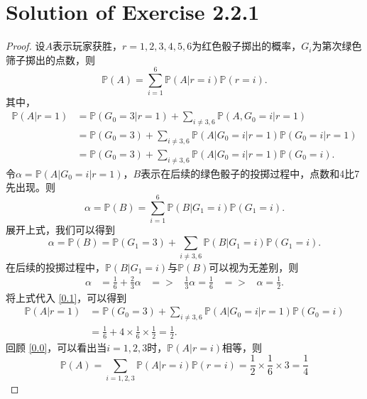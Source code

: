 \documentclass[reqno,a4paper,14pt]{amsart}
\newcommand\Pro{\mathbb{P}}
\begin{document}
\section{Solution of  Exercise 2.2.1}
\begin{proof}
    设$A$表示玩家获胜，$r=1,2,3,4,5,6$为红色骰子掷出的概率，$G_i$为第次绿色筛子掷出的点数，则
    \begin{equation}
        \Pro(A)=\sum_{i=1}^6 \Pro(A|r=i)\Pro(r=i).
        \label{0.0}
    \end{equation}
    其中，
    \begin{equation}
        \begin{split}
            \Pro(A|r=1)&=\Pro(G_0=3|r=1)+\sum_{i\neq 3,6}\Pro(A,G_0=i|r=1)\\
            &=\Pro(G_0=3)+\sum_{i\neq 3,6}\Pro(A|G_0=i|r=1)\Pro(G_0=i|r=1)\\
            &=\Pro(G_0=3)+\sum_{i\neq 3,6}\Pro(A|G_0=i|r=1)\Pro(G_0=i).
            \label{0.1}
        \end{split}
    \end{equation}
    令$\alpha=\Pro(A|G_0=i|r=1)$，$B$表示在后续的绿色骰子的投掷过程中，点数和4比7先出现。则
    \begin{equation*}
        \alpha=\Pro(B)=\sum_{i=1}^6\Pro(B|G_1=i)\Pro(G_1=i).
    \end{equation*}
    展开上式，我们可以得到
    \begin{equation*}
        \alpha=\Pro(B)=\Pro(G_1=3)+\sum_{i\neq 3,6}\Pro(B|G_1=i)\Pro(G_1=i).
    \end{equation*}
    在后续的投掷过程中，$\Pro(B|G_1=i)$与$\Pro(B)$可以视为无差别，则
    \begin{equation*}
        \begin{split}
            \alpha&=\frac{1}{6}+\frac{2}{3}\alpha\;\;\;=>\;\;\;\frac{1}{3}\alpha=\frac{1}{6}\;\;\;=>\;\;\;\alpha=\frac{1}{2}.
        \end{split}
    \end{equation*}
    将上式代入 \eqref{0.1}，可以得到
    \begin{equation*}
        \begin{split}
            \Pro(A|r=1)&=\Pro(G_0=3)+\sum_{i\neq 3,6}\Pro(A|G_0=i|r=1)\Pro(G_0=i)\\
            &=\frac{1}{6}+4\times\frac{1}{6}\times\frac{1}{2}=\frac{1}{2}.
        \end{split}
    \end{equation*}
    回顾 \eqref{0.0}，可以看出当$i=1,2,3$时，$\Pro(A|r=i)$相等，则
    \begin{equation*}
        \Pro(A)=\sum_{i=1,2,3}\Pro(A|r=i)\Pro(r=i)=\frac{1}{2}\times\frac{1}{6}\times 3=\frac{1}{4}
    \end{equation*}
\end{proof}
\end{document}
